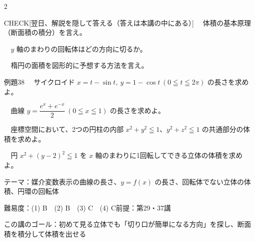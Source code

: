 \documentclass[paper=b5j, fontsize=8pt, fleqn, twoside]{jlreq}
\begin{document}
\begin{multicols*}{2}
  \begin{ptbs}{CHECK}[翌日、解説を隠して答える（答えは本講の中にある）]
    　体積の基本原理（断面積の積分）を言え。\par
    　$y$ 軸のまわりの回転体はどの方向に切るか。\par
    　楕円の面積を図形的に予想する方法を言え。
  \end{ptbs}

  \notefill
  \columnbreak
  \notefill
\end{multicols*}

\begin{ascolorbox4A}[出典：オリジナル]{例題38}
  　サイクロイド $x=t-\sin t,\ y=1-\cos t\ (0\leqq t\leqq2\pi)$ の長さを求めよ。\par
  　曲線 $y=\dfrac{e^x+e^{-x}}2\ (0\leqq x\leqq1)$ の長さを求めよ。\par
  　座標空間において、2つの円柱の内部 $x^2+y^2\leqq1$、$y^2+z^2\leqq1$ の共通部分の体積を求めよ。\par
  　円 $x^2+(y-2)^2\leqq1$ を $x$ 軸のまわりに1回転してできる立体の体積を求めよ。
\end{ascolorbox4A}

\begin{Data}
  テーマ：媒介変数表示の曲線の長さ、$y=f(x)$ の長さ、回転体でない立体の体積、円環の回転体\par
  難易度：(1) B　(2) B　(3) C　(4) C\quad 前提：第29・37講\par
  この講のゴール：初めて見る立体でも「切り口が簡単になる方向」を探し、断面積を積分して体積を出せる
\end{Data}
\end{document}

